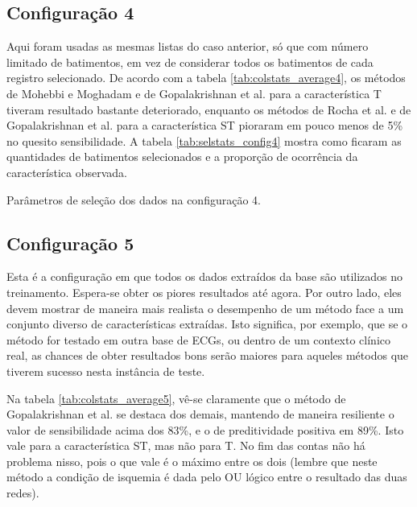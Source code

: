 
\subsection*{Configuração 4}
Aqui foram usadas as mesmas listas do caso anterior, só que com número limitado de batimentos, em vez de considerar todos os batimentos de cada registro selecionado. De acordo com a tabela \ref{tab:colstats_average4}, os métodos de Mohebbi e Moghadam e de Gopalakrishnan et al. para a característica T tiveram resultado bastante deteriorado, enquanto os métodos de Rocha et al. e de Gopalakrishnan et al. para a característica ST pioraram em pouco menos de 5\% no quesito sensibilidade. A tabela \ref{tab:selstats_config4} mostra como ficaram as quantidades de batimentos selecionados e a proporção de ocorrência da característica observada.


\begin{table}[ht!]
    \centering
    
    \caption[Parâmetros de seleção dos dados na configuração 4]{Parâmetros de seleção dos dados na configuração 4.}
    \label{tab:selstats_config4}
\end{table}

\subsection*{Configuração 5}
Esta é a configuração em que todos os dados extraídos da base são utilizados no treinamento. Espera-se obter os piores resultados até agora. Por outro lado, eles devem mostrar de maneira mais realista o desempenho de um método face a um conjunto diverso de características extraídas. Isto significa, por exemplo, que se o método for testado em outra base de ECGs, ou dentro de um contexto clínico real, as chances de obter resultados bons serão maiores para aqueles métodos que tiverem sucesso nesta instância de teste.

Na tabela \ref{tab:colstats_average5}, vê-se claramente que o método de Gopalakrishnan et al. se destaca dos demais, mantendo de maneira resiliente o valor de sensibilidade acima dos 83\%, e o de preditividade positiva em 89\%. Isto vale para a característica ST, mas não para T. No fim das contas não há problema nisso, pois o que vale é o máximo entre os dois (lembre que neste método a condição de isquemia é dada pelo OU lógico entre o resultado das duas redes).

